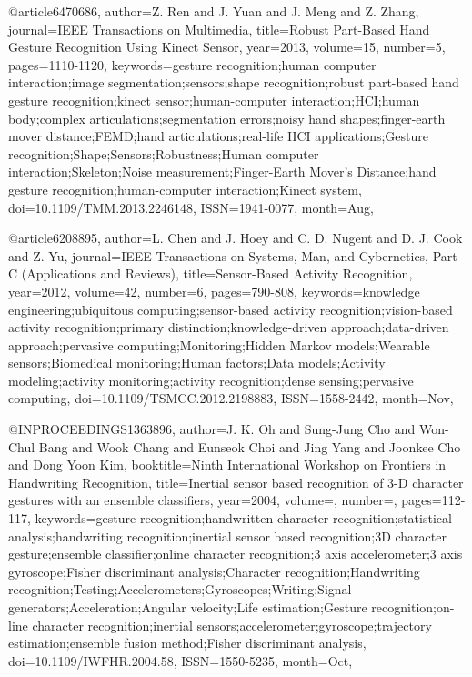 @article{6470686,
  author={Z. {Ren} and J. {Yuan} and J. {Meng} and Z. {Zhang}},
  journal={IEEE Transactions on Multimedia},
  title={Robust Part-Based Hand Gesture Recognition Using Kinect Sensor},
  year={2013},
  volume={15},
  number={5},
  pages={1110-1120},
  keywords={gesture recognition;human computer interaction;image segmentation;sensors;shape recognition;robust part-based hand gesture recognition;kinect sensor;human-computer interaction;HCI;human body;complex articulations;segmentation errors;noisy hand shapes;finger-earth mover distance;FEMD;hand articulations;real-life HCI applications;Gesture recognition;Shape;Sensors;Robustness;Human computer interaction;Skeleton;Noise measurement;Finger-Earth Mover's Distance;hand gesture recognition;human-computer interaction;Kinect system},
  doi={10.1109/TMM.2013.2246148},
  ISSN={1941-0077},
  month={Aug},
}

@article{6208895,
author={L. {Chen} and J. {Hoey} and C. D. {Nugent} and D. J. {Cook} and Z. {Yu}},
journal={IEEE Transactions on Systems, Man, and Cybernetics, Part C (Applications and Reviews)},
title={Sensor-Based Activity Recognition},
year={2012},
volume={42},
number={6},
pages={790-808},
keywords={knowledge engineering;ubiquitous computing;sensor-based activity recognition;vision-based activity recognition;primary distinction;knowledge-driven approach;data-driven approach;pervasive computing;Monitoring;Hidden Markov models;Wearable sensors;Biomedical monitoring;Human factors;Data models;Activity modeling;activity monitoring;activity recognition;dense sensing;pervasive computing},
doi={10.1109/TSMCC.2012.2198883},
ISSN={1558-2442},
month={Nov},}

@INPROCEEDINGS{1363896,
author={J. K. {Oh} and {Sung-Jung Cho} and {Won-Chul Bang} and {Wook Chang} and {Eunseok Choi} and {Jing Yang} and {Joonkee Cho} and {Dong Yoon Kim}},
booktitle={Ninth International Workshop on Frontiers in Handwriting Recognition},
title={Inertial sensor based recognition of 3-D character gestures with an ensemble classifiers},
year={2004},
volume={},
number={},
pages={112-117},
keywords={gesture recognition;handwritten character recognition;statistical analysis;handwriting recognition;inertial sensor based recognition;3D character gesture;ensemble classifier;online character recognition;3 axis accelerometer;3 axis gyroscope;Fisher discriminant analysis;Character recognition;Handwriting recognition;Testing;Accelerometers;Gyroscopes;Writing;Signal generators;Acceleration;Angular velocity;Life estimation;Gesture recognition;on-line character recognition;inertial sensors;accelerometer;gyroscope;trajectory estimation;ensemble fusion method;Fisher discriminant analysis},
doi={10.1109/IWFHR.2004.58},
ISSN={1550-5235},
month={Oct},}


